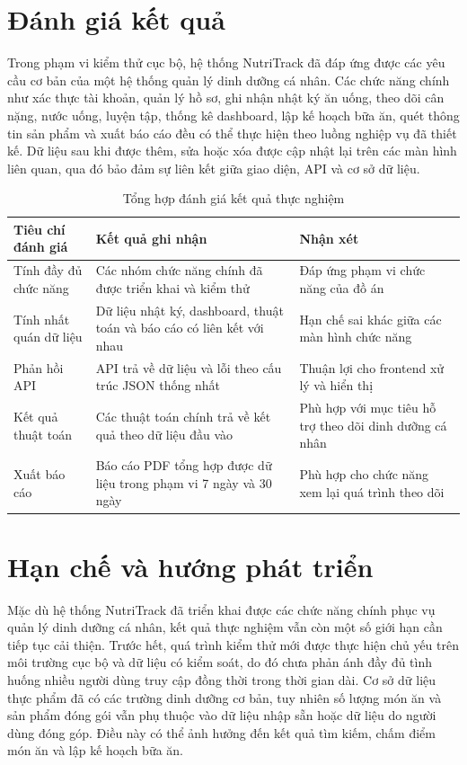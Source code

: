 \documentclass[12pt, a4paper]{report}
\begin{document}
\section{Đánh giá kết quả}Trong phạm vi kiểm thử cục bộ, hệ thống NutriTrack đã đáp ứng được các yêu cầu cơ bản của một hệ thống quản lý dinh dưỡng cá nhân. Các chức năng chính như xác thực tài khoản, quản lý hồ sơ, ghi nhận nhật ký ăn uống, theo dõi cân nặng, nước uống, luyện tập, thống kê dashboard, lập kế hoạch bữa ăn, quét thông tin sản phẩm và xuất báo cáo đều có thể thực hiện theo luồng nghiệp vụ đã thiết kế. Dữ liệu sau khi được thêm, sửa hoặc xóa được cập nhật lại trên các màn hình liên quan, qua đó bảo đảm sự liên kết giữa giao diện, API và cơ sở dữ liệu.

\begin{table}[htbp]
\centering
\caption{Tổng hợp đánh giá kết quả thực nghiệm}
\label{tab:tong_hop_danh_gia}
\begin{tabular}{|>{\raggedright\arraybackslash}p{4cm}|>{\raggedright\arraybackslash}p{4cm}|p{7cm}|}
\hline
\textbf{Tiêu chí đánh giá} & \textbf{Kết quả ghi nhận} & \textbf{Nhận xét} \\
\hline
Tính đầy đủ chức năng & Các nhóm chức năng chính đã được triển khai và kiểm thử & Đáp ứng phạm vi chức năng của đồ án \\
\hline
Tính nhất quán dữ liệu & Dữ liệu nhật ký, dashboard, thuật toán và báo cáo có liên kết với nhau & Hạn chế sai khác giữa các màn hình chức năng \\
\hline
Phản hồi API & API trả về dữ liệu và lỗi theo cấu trúc JSON thống nhất & Thuận lợi cho frontend xử lý và hiển thị \\
\hline
Kết quả thuật toán & Các thuật toán chính trả về kết quả theo dữ liệu đầu vào & Phù hợp với mục tiêu hỗ trợ theo dõi dinh dưỡng cá nhân \\
\hline
Xuất báo cáo & Báo cáo PDF tổng hợp được dữ liệu trong phạm vi 7 ngày và 30 ngày & Phù hợp cho chức năng xem lại quá trình theo dõi \\
\hline
\end{tabular}
\end{table}

\section{Hạn chế và hướng phát triển}Mặc dù hệ thống NutriTrack đã triển khai được các chức năng chính phục vụ quản lý dinh dưỡng cá nhân, kết quả thực nghiệm vẫn còn một số giới hạn cần tiếp tục cải thiện. Trước hết, quá trình kiểm thử mới được thực hiện chủ yếu trên môi trường cục bộ và dữ liệu có kiểm soát, do đó chưa phản ánh đầy đủ tình huống nhiều người dùng truy cập đồng thời trong thời gian dài. Cơ sở dữ liệu thực phẩm đã có các trường dinh dưỡng cơ bản, tuy nhiên số lượng món ăn và sản phẩm đóng gói vẫn phụ thuộc vào dữ liệu nhập sẵn hoặc dữ liệu do người dùng đóng góp. Điều này có thể ảnh hưởng đến kết quả tìm kiếm, chấm điểm món ăn và lập kế hoạch bữa ăn.
\end{document}
